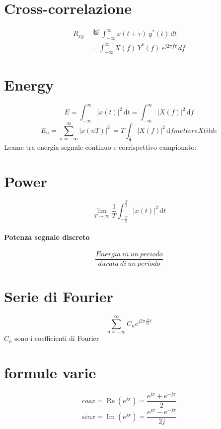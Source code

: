 \documentclass[12pt,a4paper,]{article}
\begin{document}
 \section{Cross-correlazione}
 \begin{align}
 R_{xy} & \, \stackrel{\mathrm{def}}{=}  \int_{-\infty}^{\infty} x(t+\tau)\ y^*(t) \,dt \\
 & = \int_{-\infty}^{\infty} X(f)\ Y^*(f)\ e^{j2\pi f \tau} \,df
 \end{align}
\section{Energy}
\begin{equation}
E= \int_{-\infty}^{\infty} \! |x(t)|^{2}\, \mathrm{d}t = \int_{-\infty}^{\infty} \! |X(f)|^{2}\, \mathrm{d}f
\end{equation}
\begin{equation}
E_{n}= \sum_{n= -\infty}^{\infty} \! |x(nT)|^{2}\, = T \int_{\frac{1}{T}} \! |X(f)|^{2}\, \mathrm{d}f mettere X tilde
\end{equation}
Leame tra energia segnale continuo e corrispettivo campionato:
\section{Power}
\begin{equation}
\lim_{T\to\infty} \frac{1}{T} \int_{-\frac{T}{2}}^{\frac{T}{2}} \! |x(t)|^{2}\, \mathrm{d}t 
\end{equation}
 \paragraph{Potenza segnale discreto}
 \begin{equation}
 \frac{Energia \: in \: un\:  periodo}{durata \: di \: un \: periodo}
 \end{equation}
 \section{Serie di Fourier}
 \begin{equation}
 \sum_{n=-\infty}^{\infty}  C_{n} e^{j2\pi\frac{n}{T_{0}}t}
  \end{equation}
  $C_{n}$ sono i coefficienti di Fourier
  
 \section{formule varie}
 \begin{equation}
 cos x = \operatorname{Re} \left(e^{jx}\right) =\frac{e^{jx} + e^{-jx}}{2}
  \end{equation}
   \begin{equation}
sin x = \operatorname{Im} \left(e^{jx}\right) =\frac{e^{jx} - e^{-jx}}{2j}
 \end{equation}
 
 
 
\end{document}
